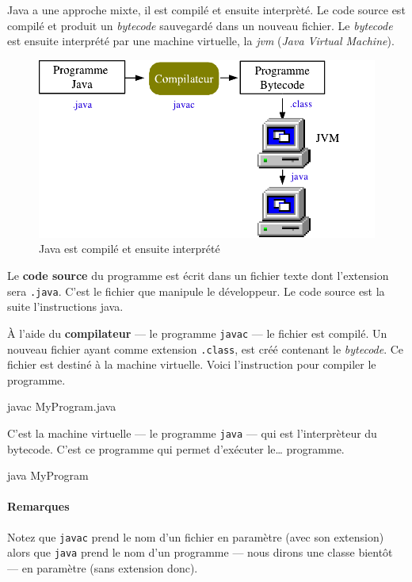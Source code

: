 Java a une approche mixte, il est compilé et ensuite interprèté. Le code source
est compilé et produit un \textit{bytecode} sauvegardé dans un nouveau fichier.
Le \textit{bytecode} est ensuite interprété par une machine virtuelle, la
\textit{jvm}  (\textit{Java Virtual Machine}). 

\bigskip
\begin{figure}[h]
\begin{center}
\includegraphics[width=14cm]{images/java-jvm-jvm2}

\caption{Java est compilé et ensuite interprété}
\label{jvm}
\end{center}
\end{figure}

Le \textbf{code source} du programme est écrit dans un fichier texte dont
l'extension sera \texttt{.java}. C'est le fichier que manipule le développeur.
Le code source est la suite l'instructions java. 

À l'aide du \textbf{compilateur} — le programme \texttt{javac} — le fichier est
compilé. Un nouveau fichier ayant comme extension \texttt{.class}, est créé
contenant le \textit{bytecode}.  Ce fichier est destiné à la machine virtuelle.
Voici l'instruction pour compiler le programme.

\begin{term}
	javac MyProgram.java
\end{term}

C'est la machine virtuelle — le programme \texttt{java} — qui est l'interprèteur 
du bytecode. C'est ce programme qui permet d'exécuter le… programme. 

\begin{term}
	java MyProgram
\end{term}

\paragraph{Remarques} Notez que \texttt{javac} prend le nom d'un fichier en
paramètre (avec son extension) alors que \texttt{java} prend le nom d'un
programme — nous dirons une classe bientôt — en paramètre (sans extension donc). 

